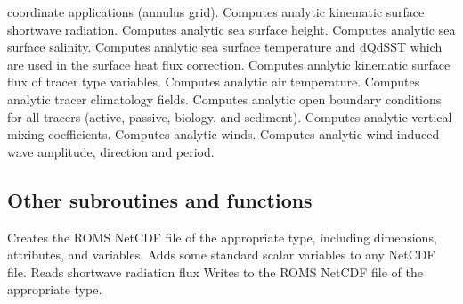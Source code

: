 \begin{klist}
   coordinate applications (annulus grid).
       Computes analytic kinematic surface
   shortwave radiation.
       Computes analytic sea surface height.
       Computes analytic sea surface salinity.
       Computes analytic sea surface temperature
   and dQdSST which are used in the surface heat flux correction.
       Computes analytic kinematic surface
   flux of tracer type variables.
       Computes analytic air temperature.
       Computes analytic tracer climatology fields.
       Computes analytic open boundary conditions for
   all tracers (active, passive, biology, and sediment).
       Computes analytic vertical mixing coefficients.
       Computes analytic winds.
       Computes analytic wind-induced wave amplitude,
     direction and period.
   \end{klist}

\subsection{Other subroutines and functions}
\label{Minor}
\begin{klist}
 \mbox{\hspace{1in}}
   \begin{klist}
      Creates the ROMS NetCDF file of the appropriate
   type, including dimensions, attributes, and variables.
      Adds some standard scalar variables to any NetCDF file.
       Reads shortwave radiation flux
      Writes to the ROMS NetCDF file of the appropriate type.
   \end{klist}
\end{klist}

